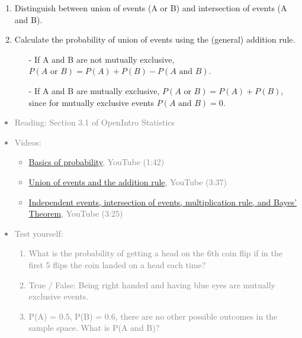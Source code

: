 \documentclass[11pt]{article}
\newcommand{\gray}[1]{\textcolor{gray}{#1}}
\begin{document}
\begin{enumerate}
\item Distinguish between union of events (A or B) and intersection of events (A and B).

\item Calculate the probability of union of events using the (general) addition rule.
\begin{itemize}
\item[-] If A and B are not mutually exclusive, $P(A \text{ or } B) = P(A) + P(B) - P(A \text{ and } B)$.
\item[-] If A and B are mutually exclusive, $P(A \text{ or } B) = P (A) + P (B)$, since for mutually exclusive events $P(A \text{ and } B) = 0$.
\end{itemize}

\end{enumerate}

\gray{
{\it
\vspace{-0.75cm}
\begin{itemize}
\renewcommand{\labelitemi}{{\textcolor{dark}{$\ast$}}}
\item Reading: Section 3.1 of OpenIntro Statistics
\item Videos:
\begin{itemize}
\item \href{http://www.youtube.com/watch?v=zMv-zcO8Jmk}{Basics of probability}, YouTube (1:42) 
\item \href{http://www.youtube.com/watch?v=DOooyE6liLY}{Union of events and the addition rule}, YouTube (3:37)
\item \href{http://www.youtube.com/watch?v=Q_7PR9kRXWs}{Independent events, intersection of events, multiplication rule, and Bayes' Theorem}, YouTube (3:25)
\end{itemize}
\item Test yourself:
\begin{enumerate}
\item What is the probability of getting a head on the 6th coin flip if in the first 5 flips the coin landed on a head each time?
\item True / False: Being right handed and having blue eyes are mutually exclusive events.
\item P(A) = 0.5, P(B) = 0.6, there are no other possible outcomes in the sample space. What is P(A and B)?
\end{enumerate}
\end{itemize}
}}


%

\vspace{0.48cm}
\end{document}
